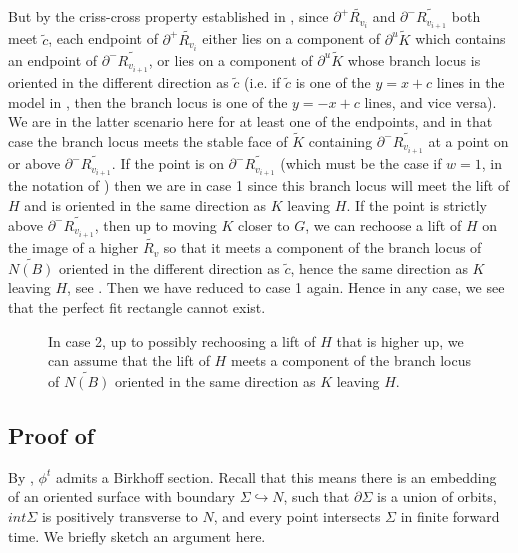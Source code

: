 \documentclass[12pt]{amsart}
\theoremstyle{definition}
\numberwithin{equation}{section}
\begin{document}
But by the criss-cross property established in , since $\partial^+ \widetilde{R_{v_i}}$ and $\partial^- \widetilde{R_{v_{i+1}}}$ both meet $\widetilde{c}$, each endpoint of $\partial^+ \widetilde{R_{v_i}}$ either lies on a component of $\partial^u \widetilde{K}$ which contains an endpoint of $\partial^- \widetilde{R_{v_{i+1}}}$, or lies on a component of $\partial^u \widetilde{K}$ whose branch locus is oriented in the different direction as $\widetilde{c}$ (i.e. if $\widetilde{c}$ is one of the $y=x+c$ lines in the model in , then the branch locus is one of the $y=-x+c$ lines, and vice versa). We are in the latter scenario here for at least one of the endpoints, and in that case the branch locus meets the stable face of $\widetilde{K}$ containing $\partial^- \widetilde{R_{v_{i+1}}}$ at a point on or above $\partial^- \widetilde{R_{v_{i+1}}}$. If the point is on $\partial^- \widetilde{R_{v_{i+1}}}$ (which must be the case if $w=1$, in the notation of ) then we are in case 1 since this branch locus will meet the lift of $H$ and is oriented in the same direction as $K$ leaving $H$. If the point is strictly above $\partial^- \widetilde{R_{v_{i+1}}}$, then up to moving $K$ closer to $G$, we can rechoose a lift of $H$ on the image of a higher $\widetilde{R_v}$ so that it meets a component of the branch locus of $\widetilde{N(B)}$ oriented in the different direction as $\widetilde{c}$, hence the same direction as $K$ leaving $H$, see . Then we have reduced to case 1 again. Hence in any case, we see that the perfect fit rectangle cannot exist.

\begin{figure}
    \centering
    \fontsize{16pt}{16pt}\selectfont
    \resizebox{!}{12cm}{}
    \caption{In case 2, up to possibly rechoosing a lift of $H$ that is higher up, we can assume that the lift of $H$ meets a component of the branch locus of $\widetilde{N(B)}$ oriented in the same direction as $K$ leaving $H$.}
    \label{fig:perfectfitarg2}
\end{figure}

\subsection{Proof of } \label{subsec:smooth}

By \cite{Bru95}, $\phi^t$ admits a Birkhoff section. Recall that this means there is an embedding of an oriented surface with boundary $\Sigma \hookrightarrow N$, such that $\partial \Sigma$ is a union of orbits, $int \Sigma$ is positively transverse to $N$, and every point intersects $\Sigma$ in finite forward time. We briefly sketch an argument here.
\end{document}
